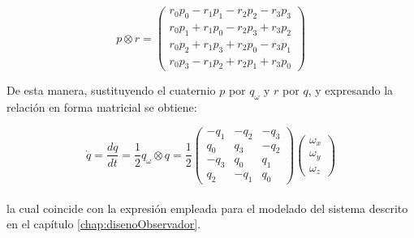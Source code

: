 \begin{equation}
p \otimes r = \begin{pmatrix}
	r_0p_0 - r_1p_1 - r_2p_2 - r_3p_3 \\
	r_0p_1 + r_1p_0 - r_2p_3 + r_3p_2 \\
	r_0p_2 + r_1p_3 + r_2p_0 - r_3p_1 \\
	r_0p_3 - r_1p_2 + r_2p_1 + r_3p_0
\end{pmatrix}
\end{equation}

De esta manera, sustituyendo el cuaternio $p$ por $q_\omega$ y $r$ por $q$, y expresando la relación en forma matricial se obtiene:

\begin{equation}
\dot{q} = \frac{d q}{dt} = \frac{1}{2}q_\omega \otimes q =  
	\frac{1}{2}
	\begin{pmatrix}
	-q_1 & -q_2 & -q_3 \\ q_0 & q_3 & -q_2 \\ -q_3 & q_0 & q_1 \\ q_2 & -q_1 & q_0
	\end{pmatrix}
	\begin{pmatrix}
	\omega_x \\ \omega_y \\ \omega_z
	\end{pmatrix}
\end{equation} \\
\noindent
la cual coincide con la expresión empleada para el modelado del sistema descrito en el capítulo \ref{chap:disenoObservador}. \par 
